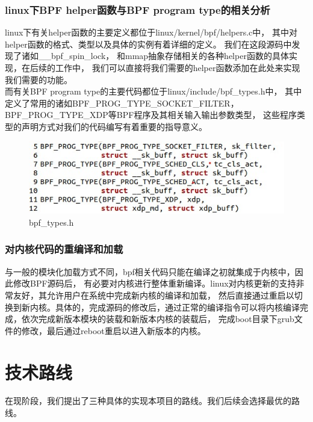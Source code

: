 \documentclass[AutoFakeBold,a4paper]{ctexart}
\begin{document}
\subsubsection{linux下BPF helper函数与BPF program type的相关分析}
linux下有关{\ttfamily helper}函数的主要定义都位于{\ttfamily linux/kernel/bpf/helpers.c}中，
其中对{\ttfamily helper}函数的格式、类型以及具体的实例有着详细的定义。
我们在这段源码中发现了诸如{\ttfamily \_\_bpf\_spin\_lock}，
和{\ttfamily mmap}抽象存储相关的各种{\ttfamily helper}函数的具体实现，在后续的工作中，
我们可以直接将我们需要的{\ttfamily helper}函数添加在此处来实现我们需要的功能。\\ 
而有关BPF program type的主要代码都位于{\ttfamily linux/include/bpf\_types.h}中，
其中定义了常用的诸如{\ttfamily BPF\_PROG\_TYPE\_SOCKET\_FILTER}，
{\ttfamily BPF\_PROG\_TYPE\_XDP}等BPF程序及其相关输入输出参数类型，
这些程序类型的声明方式对我们的代码编写有着重要的指导意义。
\begin{figure}[H]
    \centering
    \includegraphics[width=0.9\columnwidth]{pic_3.jpg}
    \caption{\ttfamily bpf\_types.h}
\end{figure}

\subsubsection{对内核代码的重编译和加载}
与一般的模块化加载方式不同，bpf相关代码只能在编译之初就集成于内核中，因此修改BPF源码后，
有必要对内核进行整体重新编译。linux对内核更新的支持非常友好，其允许用户在系统中完成新内核的编译和加载，
然后直接通过重启以切换到新内核。具体的，完成源码的修改后，通过正常的编译指令可以将内核编译完成，依次完成新版本模块的装载和新版本内核的装载后，
完成boot目录下grub文件的修改，最后通过reboot重启以进入新版本的内核。




\section{技术路线}
在现阶段，我们提出了三种具体的实现本项目的路线。我们后续会选择最优的路线。
\end{document}

